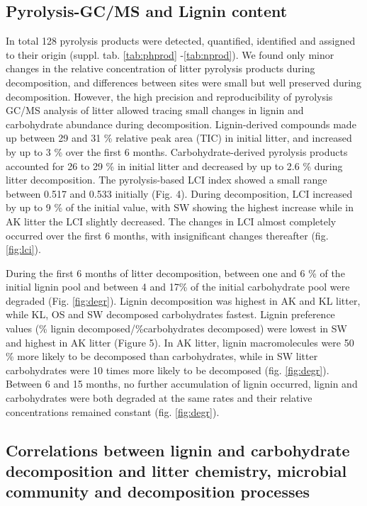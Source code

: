 \subsection*{Pyrolysis-GC/MS and Lignin content}
In total 128 pyrolysis products were detected, quantified, identified and assigned to their origin (suppl. tab. \ref{tab:phprod} -\ref{tab:nprod}). We found only minor changes in the relative concentration of litter pyrolysis products during decomposition, and differences between sites were small but well preserved during decomposition. However, the high precision and reproducibility of pyrolysis GC/MS analysis of litter allowed tracing small changes in lignin and carbohydrate abundance during decomposition. Lignin-derived compounds made up between 29 and 31 \% relative peak area (TIC) in initial litter, and increased by up to 3 \% over the first 6 months. Carbohydrate-derived pyrolysis products accounted for 26 to 29 \% in initial litter and decreased by up to 2.6 \% during litter decomposition. The pyrolysis-based LCI index  showed a small range between 0.517 and 0.533 initially (Fig. 4). During decomposition, LCI increased by up to 9 \% of the initial value, with SW showing the highest increase while in AK litter the LCI slightly decreased. The changes in LCI almost completely occurred over the first 6 months, with insignificant changes thereafter (fig. \ref{fig:lci}).

During the first 6 months of litter decomposition, between one and 6 \% of the initial lignin pool and between 4 and 17\% of the initial carbohydrate pool were degraded (Fig. \ref{fig:degr}). Lignin decomposition was highest in AK and KL litter, while KL, OS and SW decomposed carbohydrates fastest. Lignin preference values (\% lignin decomposed/\%carbohydrates decomposed) were lowest in SW and highest in AK litter (Figure 5). In AK litter, lignin macromolecules were 50 \% more likely to be decomposed than carbohydrates, while in SW litter carbohydrates were 10 times more likely to be decomposed (fig. \ref{fig:degr}). Between 6 and 15 months, no further accumulation of lignin occurred, lignin and carbohydrates were both degraded at the same rates and their relative concentrations remained constant (fig. \ref{fig:degr}).

\subsection*{Correlations between lignin and carbohydrate decomposition and litter chemistry, microbial community and decomposition processes}

